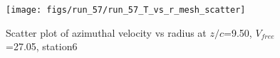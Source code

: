 \begin{figure}[H]
\centering
\texttt{[image: figs/run\_57/run\_57\_T\_vs\_r\_mesh\_scatter]}
\caption{Scatter plot of azimuthal velocity vs radius at $z/c$=9.50, $V_{free}$=27.05, station6}
\label{fig:run_57_T_vs_r_mesh_scatter}
\end{figure}


